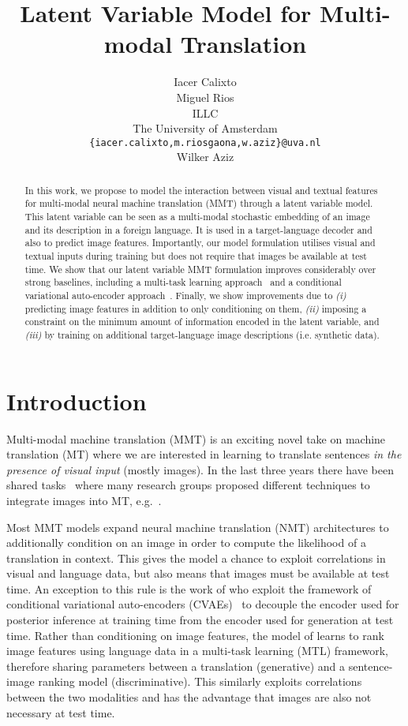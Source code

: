 \documentclass[11pt,a4paper]{article}
\title{Latent Variable Model for Multi-modal Translation}
\author{Iacer Calixto \\\And
  Miguel Rios \\
  ILLC \\
  The University of Amsterdam \\
  {\tt \{iacer.calixto,m.riosgaona,w.aziz\}@uva.nl} \\\And
  Wilker Aziz \\
  }
\begin{document}
\maketitle

\begin{abstract}
In this work, we propose to model the interaction between visual and textual features for multi-modal neural machine translation (MMT) through a latent variable model.
This latent variable can be seen as a multi-modal stochastic embedding of an image and its description in a foreign language.
It is used in a target-language decoder and also to predict image features.
Importantly, our model formulation utilises visual and textual inputs during training but does not require that images be available at test time.
We show that our latent variable MMT formulation improves considerably over strong baselines, including a multi-task learning approach~\citep{ElliottKadar2017} and a conditional variational auto-encoder approach~\citep{Toyamaetal2016}.
Finally, we show improvements due to
\textit{(i)} predicting image features in addition to only conditioning on them,
\textit{(ii)} imposing a constraint on the minimum amount of information encoded in the latent variable, and
\textit{(iii)} by training on additional target-language image descriptions (i.e. synthetic data).
\end{abstract}



\section{Introduction}

Multi-modal machine translation (MMT) is an exciting novel take on machine translation (MT) where we are interested in learning to translate sentences \textit{in the presence of visual input} (mostly images).
In the last three years there have been shared tasks~\citep{Speciaetal2016,Elliottetal2017,Barraultetal2018} where many research groups proposed different techniques to integrate images into MT, e.g.~\citet{Caglayanetal2017,LibovickyHelcl2017}.

Most MMT models expand neural machine translation (NMT) architectures \citep{Sutskever+2014:SSNN,BahdanauChoBengio2015} to additionally condition on an image in order to compute the likelihood of a translation in context. 
This gives the model a chance to exploit correlations in visual and language data, but also means that images must be available at test time.
An exception to this rule is the work of \citet{Toyamaetal2016} who exploit the framework of conditional variational auto-encoders (CVAEs)~\citep{CVAE} to decouple the encoder used for posterior inference at training time from the encoder used for generation at test time.
Rather than conditioning on image features, the model of \citet{ElliottKadar2017} learns to rank image features using language data in a multi-task learning (MTL) framework, therefore sharing parameters between a translation (generative) and a sentence-image ranking model (discriminative).
This similarly exploits correlations between the two modalities
and has the advantage that images are also not necessary at test time.
\end{document}
